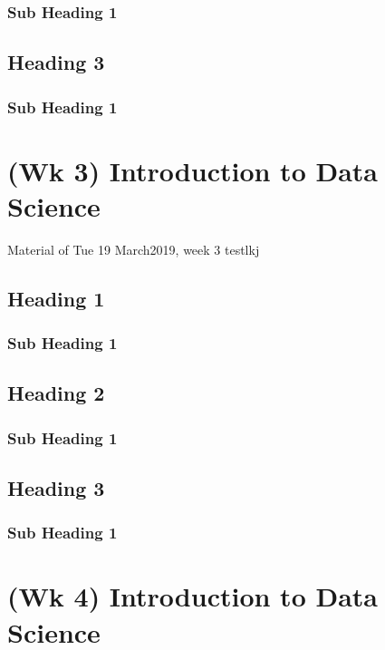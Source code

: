 \documentclass[]{book}
\begin{document}
\subsection{Sub Heading 1}\label{sub-heading-1-1}

\section{Heading 3}\label{heading-3}

\subsection{Sub Heading 1}\label{sub-heading-1-2}

\chapter{(Wk 3) Introduction to Data
Science}\label{wk-3-introduction-to-data-science}

Material of Tue 19 March2019, week 3 testlkj

\section{Heading 1}\label{heading-1-1}

\subsection{Sub Heading 1}\label{sub-heading-1-3}

\section{Heading 2}\label{heading-2-1}

\subsection{Sub Heading 1}\label{sub-heading-1-4}

\section{Heading 3}\label{heading-3-1}

\subsection{Sub Heading 1}\label{sub-heading-1-5}

\chapter{(Wk 4) Introduction to Data
Science}\label{wk-4-introduction-to-data-science}
\end{document}

